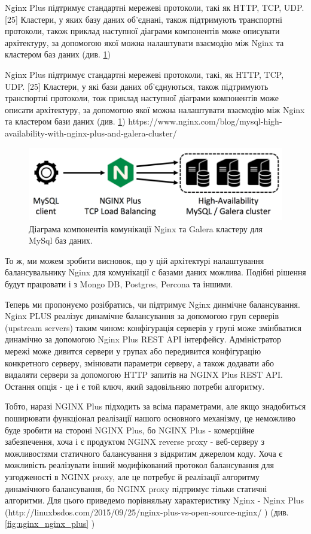 \documentclass[14pt]{vakthesis}
\begin{document}
Nginx Plus підтримує стандартні мережеві протоколи, такі як HTTP, TCP, UDP. [25]%
Кластери, у яких базу даних об'єднані, також підтримують транспортні протоколи, також приклад наступної діаграми компонентів може описувати архітектуру, за допомогою якої можна налаштувати взаємодію між Nginx та кластером баз даних (див. \ref{fig:nginx_mysql})


Nginx Plus підтримує стандартні мережеві протоколи, такі, як HTTP, TCP, UDP. [25] %
Кластери, у які  бази даних об'єднуються, також підтримують транспортні протоколи, тож приклад наступної діаграми компонентів може описати архітектуру, за допомогою якої можна налаштувати взаємодію між Nginx та кластером бази даних (див. \ref{fig:nginx_mysql})
https://www.nginx.com/blog/mysql-high-availability-with-nginx-plus-and-galera-cluster/

\begin{figure}
\centering
\includegraphics[width=\linewidth]{images/nginx-plus-load-balancing.png}
     \caption{Діаграма компонентів комунікації Nginx та Galera кластеру для MySql баз даних.}
     \label{fig:nginx_mysql}
\end{figure}

То ж, ми можем зробити висновок, що у цій архітектурі налаштування балансувальнику Nginx для комунікації с базами даних можлива. Подібні рішення будут працювати і з Mongo DB, Postgres, Percona та іншими. 

Теперь ми пропонуємо розібратись, чи підтримує Nginx динмічне балансування. 
Nginx PLUS реалізує динамічне балансування за допомогою груп серверів (upstream servers) таким чином: конфігурація серверів у групі може змінбватися динамічно за допомогою Nginx Plus REST API інтерфейсу. Адміністратор мережі може дивится сервери у групах або передивится конфігурацію конкретного серверу, змінювати параметри серверу, а також додавати або видаляти сервери за допомогою HTTP запитів на NGINX Plus REST API.
Остання опція - це і є той ключ, який задовільняю потреби алгоритму. 

Тобто, наразі NGINX Plus підходить за всіма параметрами, але якщо знадобиться поширювати функціонал реалізації нашого основного механізму, це неможливо буде зробити на стороні NGINX Plus, бо NGINX Plus - комерційне забезпечення, хоча і є продуктом NGINX reverse proxy - веб-серверу з можливостями статичного балансування з відкритим джерелом коду. Хоча є можливість реалізувати інший модифікований протокол балансування для узгодженості в NGINX proxy, але це потребує й реалізації алгоритму динамічного балансування, бо NGINX proxy підтримує тільки статичні алгоритми. Для цього приведемо порівняльну характеристику Nginx - Nginx Plus
(http://linuxbsdos.com/2015/09/25/nginx-plus-vs-open-source-nginx/ ) (див.\ref{fig:nginx_nginx_plus} )
\end{document}
